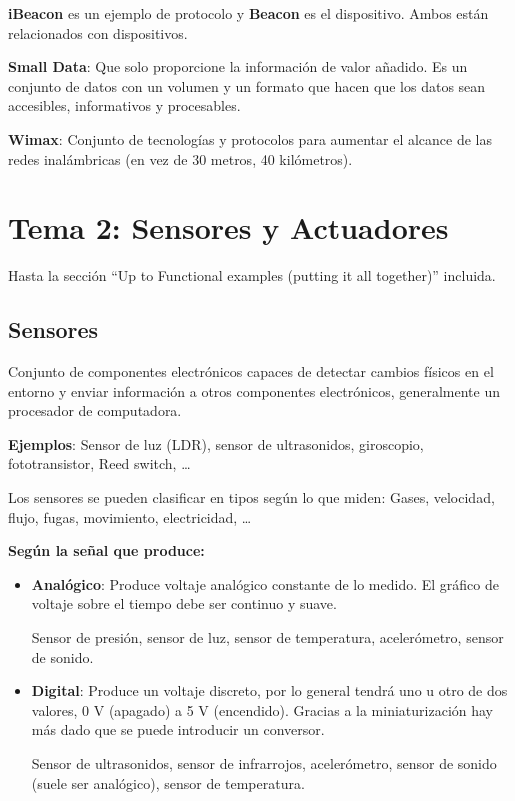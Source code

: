 \documentclass[12pt, twoside, openright]{report} %
\begin{document}
\textbf{iBeacon} es un ejemplo de protocolo y \textbf{Beacon} es el
dispositivo. Ambos están relacionados con dispositivos.

\textbf{Small Data}: Que solo proporcione la información de valor
añadido. Es un conjunto de datos con un volumen y un formato que hacen
que los datos sean accesibles, informativos y procesables.

\textbf{Wimax}: Conjunto de tecnologías y protocolos para aumentar el
alcance de las redes inalámbricas (en vez de 30 metros, 40 kilómetros).

\chapter{Tema 2: Sensores y
  Actuadores}


Hasta la sección “Up to Functional examples
(putting it all together)” incluida.

\section{Sensores}

Conjunto de componentes electrónicos capaces de detectar cambios físicos
en el entorno y enviar información a otros componentes electrónicos,
generalmente un procesador de computadora.

\textbf{Ejemplos}: Sensor de luz (LDR), sensor de ultrasonidos,
giroscopio, fototransistor, Reed switch, \ldots{}

Los sensores se pueden clasificar en tipos según lo que miden: Gases,
velocidad, flujo, fugas, movimiento, electricidad, \ldots{}

\textbf{Según la señal que produce:}

\begin{itemize}
	\item \textbf{Analógico}: Produce voltaje analógico constante de lo medido.
	      El gráfico de voltaje sobre el tiempo debe ser continuo y suave.

	      Sensor de presión, sensor de luz, sensor de temperatura,
	      acelerómetro, sensor de sonido.
	\item \textbf{Digital}: Produce un voltaje discreto, por lo general tendrá
	      uno u otro de dos valores, 0 V (apagado) a 5 V (encendido). Gracias a la
	      miniaturización hay más dado que se puede introducir un conversor.

	      Sensor de ultrasonidos, sensor de infrarrojos, acelerómetro, sensor
	      de sonido (suele ser analógico), sensor de temperatura.
\end{itemize}
\end{document}
